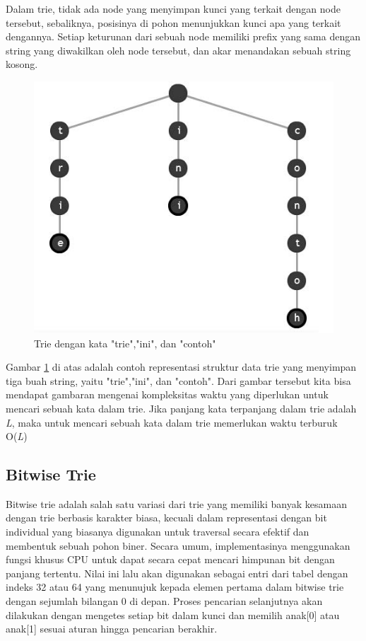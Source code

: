Dalam trie, tidak ada node yang menyimpan kunci yang terkait dengan node tersebut, sebaliknya, posisinya di pohon menunjukkan kunci apa yang terkait dengannya. Setiap keturunan dari sebuah node memiliki prefix yang sama dengan string yang diwakilkan oleh node tersebut, dan akar menandakan sebuah string kosong.

\begin{figure}[H]
\centering
\includegraphics[scale=1]{Gambar/contoh-trie-1}
\caption[Trie]{Trie dengan kata "trie","ini", dan "contoh"\cite{najogie:10:trie}} 
\label{contoh-trie-1}
\end{figure}

Gambar \ref{contoh-trie-1} di atas adalah contoh representasi struktur data trie yang menyimpan tiga buah string, yaitu "trie","ini", dan "contoh". Dari gambar tersebut kita bisa mendapat gambaran mengenai kompleksitas waktu yang diperlukan untuk mencari sebuah kata dalam trie. Jika panjang kata terpanjang dalam trie adalah \textit{L}, maka untuk mencari sebuah kata dalam trie memerlukan waktu terburuk O(\textit{L})

\subsection{Bitwise Trie}
\label{sec:bitwiseTrie}

Bitwise trie adalah salah satu variasi dari trie yang memiliki banyak kesamaan dengan trie berbasis karakter biasa, kecuali dalam representasi dengan bit individual yang biasanya digunakan untuk traversal secara efektif dan membentuk sebuah pohon biner. Secara umum, implementasinya menggunakan fungsi khusus CPU untuk dapat secara cepat mencari himpunan bit dengan panjang tertentu. Nilai ini lalu akan digunakan sebagai entri dari tabel dengan indeks 32 atau 64 yang menunujuk kepada elemen pertama dalam bitwise trie dengan sejumlah bilangan 0 di depan. Proses pencarian selanjutnya akan dilakukan dengan mengetes setiap bit dalam kunci dan memilih anak[0] atau anak[1] sesuai aturan hingga pencarian berakhir.

